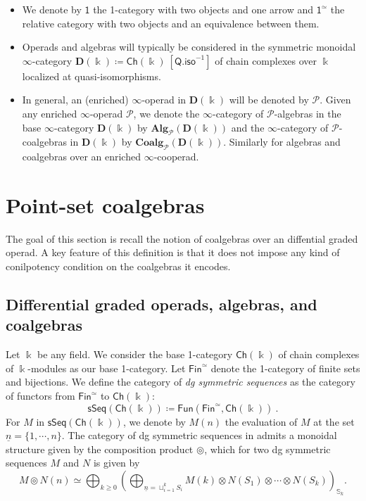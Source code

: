 \documentclass[a4paper,12pt]{amsart}
\theoremstyle{plain}
\theoremstyle{definition}
\theoremstyle{remark}
\newcommand{\kk}{\Bbbk}
\begin{document}
\begin{itemize}

    \item We denote by $\mathsf{1}$ the 1-category with two objects and one arrow and $\mathsf{1}^{\simeq}$ the relative category with two objects and an equivalence between them. 

    
    \item Operads and algebras will typically be considered in the symmetric monoidal $\infty$-category $\mathbf{D}(\kk) \coloneqq \mathsf{Ch}(\kk)~[\mathsf{Q.iso}^{-1}]$ of chain complexes over $\kk$ localized at  quasi-isomorphisms.
    
    \item In general, an (enriched) $\infty$-operad in $\mathbf{D}(\kk)$ will be denoted by $\mathscr{P}$. Given any enriched $\infty$-operad $\mathscr{P}$, we denote the $\infty$-category of $\mathscr{P}$-algebras in the base $\infty$-category $\mathbf{D}(\kk)$ by $\mathbf{Alg}_{\mathscr{P}}(\mathbf{D}(\kk))$ and the $\infty$-category of $\mathscr{P}$-coalgebras in $\mathbf{D}(\kk)$ by $\mathbf{Coalg}_{\mathscr{P}}(\mathbf{D}(\kk))$. Similarly for algebras and coalgebras over an enriched $\infty$-cooperad.
\end{itemize}

\vspace{2pc}

\section{Point-set coalgebras}

\vspace{2.5pc}

The goal of this section is recall the notion of coalgebras over an diffential graded operad. A key feature of this definition is that it does not impose any kind of conilpotency condition on the coalgebras it encodes.

\subsection{Differential graded operads, algebras, and coalgebras}\label{sec:1-operads}
Let $\kk$ be any field. We consider the base 1-category $\mathsf{Ch}(\kk)$ of chain complexes of $\kk$-modules as our base 1-category. Let $\mathsf{Fin}^{\simeq}$ denote the 1-category of finite sets and bijections. We define the category of \textit{dg symmetric sequences} as the category of functors from $\mathsf{Fin}^{\simeq}$ to $\mathsf{Ch}(\kk)$:
\[
\mathsf{sSeq}(\mathsf{Ch}(\kk)) \coloneqq \mathsf{Fun}(\mathsf{Fin}^{\simeq},\mathsf{Ch}(\kk))~. 
\]
For $M$ in $\mathsf{sSeq}(\mathsf{Ch}(\kk))$, we denote by $M(n)$ the evaluation of $M$ at the set $\underline{n}= \{1,\cdots,n\}$. The category of dg symmetric sequences in admits a monoidal structure given by the composition product $\circledcirc$, which for two dg symmetric sequences $M$ and $N$ is  given by
\[
M \circledcirc N(n) \simeq \bigoplus_{k \geq 0} \left(\bigoplus_{\underline{n} = \sqcup_{i=1}^k S_i} M(k) \otimes N(S_1) \otimes \cdots \otimes N(S_k)\right)_{\mathbb{S}_k} .
\]
\end{document}
